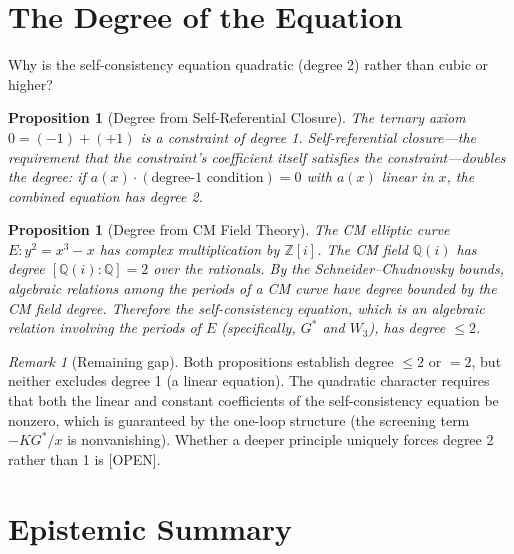 \documentclass[12pt]{article}
\newtheorem{proposition}[theorem]{Proposition}
\theoremstyle{definition}
\theoremstyle{remark}
\newtheorem{remark}[theorem]{Remark}
\begin{document}
\section{The Degree of the Equation}
\label{sec:degree}

Why is the self-consistency equation quadratic (degree 2) rather than cubic or higher?

\begin{proposition}[Degree from Self-Referential Closure]
\label{prop:degree-onto}
The ternary axiom $0 = (-1) + (+1)$ is a constraint of degree 1. Self-referential closure---the requirement that the constraint's coefficient itself satisfies the constraint---doubles the degree: if $a(x)\cdot(\text{degree-1 condition}) = 0$ with $a(x)$ linear in $x$, the combined equation has degree 2.
\end{proposition}

\begin{proposition}[Degree from CM Field Theory]
\label{prop:degree-cm}
The CM elliptic curve $E\!: y^2 = x^3 - x$ has complex multiplication by $\mathbb{Z}[i]$. The CM field $\mathbb{Q}(i)$ has degree $[\mathbb{Q}(i):\mathbb{Q}] = 2$ over the rationals. By the Schneider--Chudnovsky bounds, algebraic relations among the periods of a CM curve have degree bounded by the CM field degree. Therefore the self-consistency equation, which is an algebraic relation involving the periods of $E$ (specifically, $G^*$ and $W_3$), has degree $\leq 2$.
\end{proposition}

\begin{remark}[Remaining gap]
Both propositions establish degree $\leq 2$ or $= 2$, but neither excludes degree 1 (a linear equation). The quadratic character requires that both the linear and constant coefficients of the self-consistency equation be nonzero, which is guaranteed by the one-loop structure (the screening term $-KG^*/x$ is nonvanishing). Whether a deeper principle uniquely forces degree 2 rather than 1 is [OPEN].
\end{remark}

\section{Epistemic Summary}
\label{sec:epistemic}
\end{document}
